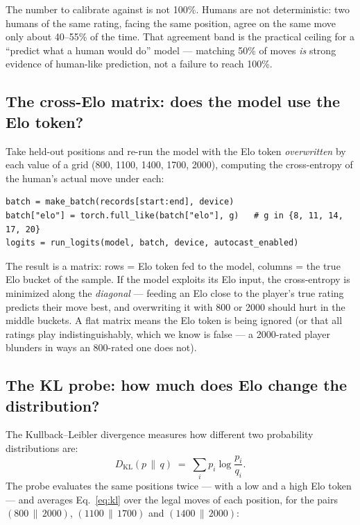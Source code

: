 \documentclass[10pt,a4paper]{article}
\newcommand{\code}[1]{\texttt{#1}}
\begin{document}
The number to calibrate against is not 100\%. Humans are not
deterministic: two humans of the same rating, facing the same position,
agree on the same move only about 40--55\% of the time. That agreement
band is the practical ceiling for a ``predict what a human would do''
model --- matching 50\% of moves \emph{is} strong evidence of human-like
prediction, not a failure to reach 100\%.

\subsection{The cross-Elo matrix: does the model use the Elo token?}

Take held-out positions and re-run the model with the Elo token
\emph{overwritten} by each value of a grid (800, 1100, 1400, 1700,
2000), computing the cross-entropy of the human's actual move under
each:

\begin{lstlisting}[style=code, caption={The Elo overwrite at the heart of
the cross-Elo report (\code{evaluate.py}, excerpt).},
label={lst:crosselo}]
batch = make_batch(records[start:end], device)
batch["elo"] = torch.full_like(batch["elo"], g)   # g in {8, 11, 14, 17, 20}
logits = run_logits(model, batch, device, autocast_enabled)
\end{lstlisting}

The result is a matrix: rows = Elo token fed to the model, columns =
the true Elo bucket of the sample. If the model exploits its Elo input,
the cross-entropy is minimized along the \emph{diagonal} --- feeding an
Elo close to the player's true rating predicts their move best, and
overwriting it with 800 or 2000 should hurt in the middle buckets. A
flat matrix means the Elo token is being ignored (or that all ratings
play indistinguishably, which we know is false --- a 2000-rated player
blunders in ways an 800-rated one does not).

\subsection{The KL probe: how much does Elo change the distribution?}

The Kullback--Leibler divergence measures how different two probability
distributions are:
\begin{equation}
D_{\mathrm{KL}}(p \,\|\, q) \;=\; \sum_i p_i \log\frac{p_i}{q_i}.
\label{eq:kl}
\end{equation}
The probe evaluates the same positions twice --- with a low and a high
Elo token --- and averages Eq.~\eqref{eq:kl} over the legal moves of
each position, for the pairs $(800\,\|\,2000)$, $(1100\,\|\,1700)$ and
$(1400\,\|\,2000)$:
\end{document}
